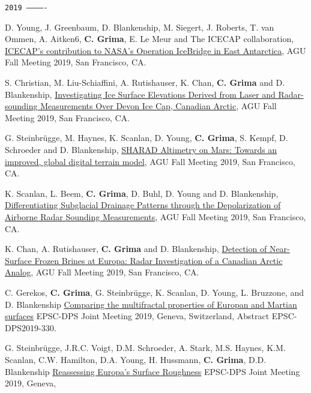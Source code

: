 \begin{etaremune}
\hspace{-2em}\texttt{2019 -------------}

\item
  D. Young, J. Greenbaum, D. Blankenship, M. Siegert, J. Roberts, T. van Ommen, A. Aitken6, \textbf{C. Grima}, E. Le Meur and The ICECAP collaboration, \href{https://agu.confex.com/agu/fm19/meetingapp.cgi/Paper/610960}{ICECAP's contribution to NASA's Operation IceBridge in East Antarctica}, AGU Fall Meeting 2019, San Francisco, CA.
\item
  S. Christian, M. Liu-Schiaffini, A. Rutishauser, K. Chan, \textbf{C. Grima} and D. Blankenship, \href{https://agu.confex.com/agu/fm19/meetingapp.cgi/Paper/588389}{Investigating Ice Surface Elevations Derived from Laser and Radar-sounding Measurements Over Devon Ice Cap, Canadian Arctic}, AGU Fall Meeting 2019, San Francisco, CA.
\item
  G. Steinbrügge, M. Haynes, K. Scanlan, D. Young, \textbf{C. Grima}, S. Kempf, D. Schroeder and D. Blankenship, \href{https://agu.confex.com/agu/fm19/meetingapp.cgi/Paper/608483}{SHARAD Altimetry on Mars: Towards an improved, global digital terrain model}, AGU Fall Meeting 2019, San Francisco, CA.
\item
  K. Scanlan, L. Beem, \textbf{C. Grima}, D. Buhl, D. Young and D. Blankenship, \href{https://agu.confex.com/agu/fm19/meetingapp.cgi/Paper/600584}{Differentiating Subglacial Drainage Patterns through the Depolarization of Airborne Radar Sounding Measurements}, AGU Fall Meeting 2019, San Francisco, CA.
\item
  K. Chan, A. Rutishauser, \textbf{C. Grima} and D. Blankenship, \href{https://agu.confex.com/agu/fm19/meetingapp.cgi/Paper/591308}{Detection of Near-Surface Frozen Brines at Europa: Radar Investigation of a Canadian Arctic Analog}, AGU Fall Meeting 2019, San Francisco, CA.
\item
  C. Gerekos, \textbf{C. Grima}, G. Steinbrügge, K. Scanlan, D. Young,
  L. Bruzzone, and D. Blankenship
  \href{https://meetingorganizer.copernicus.org/EPSC-DPS2019/EPSC-DPS2019-330.pdf}{Comparing
  the multifractal properties of Europan and Martian surfaces} EPSC-DPS
  Joint Meeting 2019, Geneva, Switzerland, Abstract EPSC-DPS2019-330.
\item
  G. Steinbrügge, J.R.C. Voigt, D.M. Schroeder, A. Stark, M.S. Haynes,
  K.M. Scanlan, C.W. Hamilton, D.A. Young, H. Hussmann, \textbf{C.
  Grima}, D.D. Blankenship
  \href{https://meetingorganizer.copernicus.org/EPSC-DPS2019/EPSC-DPS2019-865-1.pdf}{Reassessing
  Europa's Surface Roughness} EPSC-DPS Joint Meeting 2019, Geneva,

\end{etaremune}
